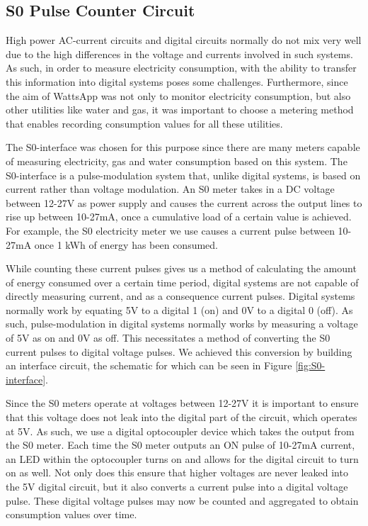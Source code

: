 \documentclass[10pt, conference, compsocconf]{IEEEtran}
\begin{document}
\subsection{S0 Pulse Counter Circuit}

High power AC-current circuits and digital circuits normally do not
mix very well due to the high differences in the voltage and currents
involved in such systems. As such, in order to measure electricity
consumption, with the ability to transfer this information into digital
systems poses some challenges. Furthermore, since the aim of WattsApp
was not only to monitor electricity consumption, but also other utilities
like water and gas, it was important to choose a metering method that
enables recording consumption values for all these utilities.

The S0-interface was chosen for this purpose since there are many
meters capable of measuring electricity, gas and water consumption
based on this system. The S0-interface is a pulse-modulation system
that, unlike digital systems, is based on current rather than voltage
modulation. An S0 meter takes in a DC voltage between 12-27V as power
supply and causes the current across the output lines to rise up between
10-27mA, once a cumulative load of a certain value is achieved. For
example, the S0 electricity meter we use causes a current pulse between
10-27mA once 1 kWh of energy has been consumed.

While counting these current pulses gives us a method of calculating
the amount of energy consumed over a certain time period, digital
systems are not capable of directly measuring current, and as a consequence
current pulses. Digital systems normally work by equating 5V to a
digital 1 (on) and 0V to a digital 0 (off). As such, pulse-modulation
in digital systems normally works by measuring a voltage of 5V as
on and 0V as off. This necessitates a method of converting the S0
current pulses to digital voltage pulses. We achieved this conversion
by building an interface circuit, the schematic for which can be seen
in Figure \ref{fig:S0-interface}.

Since the S0 meters operate at voltages between 12-27V it is important
to ensure that this voltage does not leak into the digital part of
the circuit, which operates at 5V. As such, we use a digital optocoupler
device which takes the output from the S0 meter. Each time the S0
meter outputs an ON pulse of 10-27mA current, an LED within the optocoupler
turns on and allows for the digital circuit to turn on as well. Not
only does this ensure that higher voltages are never leaked into the
5V digital circuit, but it also converts a current pulse into a digital
voltage pulse. These digital voltage pulses may now be counted and
aggregated to obtain consumption values over time.
\end{document}
